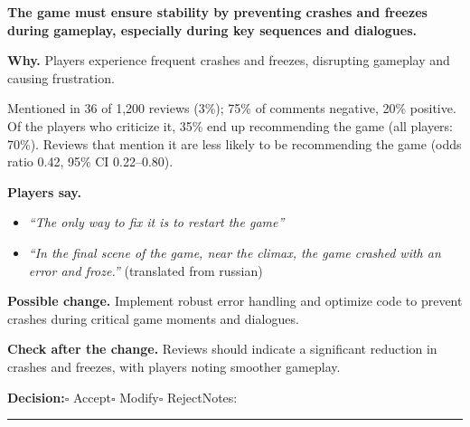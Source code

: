 \documentclass[10pt]{article}
\begin{document}
\begin{tcolorbox}[colback=white,colframe=gR,colbacktitle=lR,coltitle=black,title={\textbf{R6}\quad Crash and Stability\hfill\textcolor{gR}{\textbf{Repair first}}},boxrule=0.8pt,arc=2pt,left=6pt,right=6pt,top=4pt,bottom=4pt,before skip=8pt,after skip=8pt]
{\large\textbf{The game must ensure stability by preventing crashes and freezes during gameplay, especially during key sequences and dialogues.}}

\smallskip
\textbf{Why.} Players experience frequent crashes and freezes, disrupting gameplay and causing frustration.

\smallskip
{\small Mentioned in 36 of 1,200 reviews (3\%); 75\% of comments negative, 20\% positive. Of the players who criticize it, 35\% end up recommending the game (all players: 70\%). Reviews that mention it are less likely to be recommending the game {\color{ink2}\footnotesize(odds ratio 0.42, 95\% CI 0.22--0.80)}.}

\smallskip
\textbf{Players say.}
\begin{itemize}[leftmargin=12pt,itemsep=1pt,topsep=2pt]
    \item \textit{``The only way to fix it is to restart the game''}
    \item \textit{``In the final scene of the game, near the climax, the game crashed with an error and froze.''} {\footnotesize(translated from russian)}
\end{itemize}
\textbf{Possible change.} Implement robust error handling and optimize code to prevent crashes during critical game moments and dialogues.

\smallskip
\textbf{Check after the change.} Reviews should indicate a significant reduction in crashes and freezes, with players noting smoother gameplay.

\medskip
{\small\textbf{Decision:}\quad $\square$ Accept\quad $\square$ Modify\quad $\square$ Reject\qquad Notes: \rule{0.38\linewidth}{0.4pt}}
\end{tcolorbox}
\end{document}
